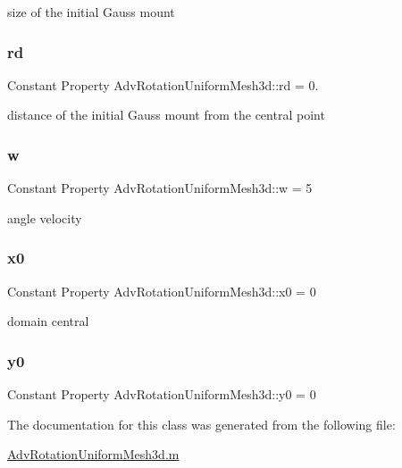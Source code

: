 size of the initial Gauss mount 

\mbox{\label{class_adv_rotation_uniform_mesh3d_a671a8cd355159cced41a25a77cda5191}} 
\subsubsection{\texorpdfstring{rd}{rd}}
{\footnotesize\ttfamily Constant Property Adv\+Rotation\+Uniform\+Mesh3d\+::rd = 0.}



distance of the initial Gauss mount from the central point 

\mbox{\label{class_adv_rotation_uniform_mesh3d_a78021752187fa4d2b67133afffbdbef6}} 
\subsubsection{\texorpdfstring{w}{w}}
{\footnotesize\ttfamily Constant Property Adv\+Rotation\+Uniform\+Mesh3d\+::w = 5}



angle velocity 

\mbox{\label{class_adv_rotation_uniform_mesh3d_ae319c96312f86a261f44e9bd0a225dd6}} 
\subsubsection{\texorpdfstring{x0}{x0}}
{\footnotesize\ttfamily Constant Property Adv\+Rotation\+Uniform\+Mesh3d\+::x0 = 0}



domain central 

\mbox{\label{class_adv_rotation_uniform_mesh3d_ad6dcc51336f2a4b365d65e44b6180c93}} 
\subsubsection{\texorpdfstring{y0}{y0}}
{\footnotesize\ttfamily Constant Property Adv\+Rotation\+Uniform\+Mesh3d\+::y0 = 0}



The documentation for this class was generated from the following file\+:\begin{DoxyCompactItemize}
\item 
\hyperlink{_adv_rotation_uniform_mesh3d_8m}{Adv\+Rotation\+Uniform\+Mesh3d.\+m}\end{DoxyCompactItemize}
